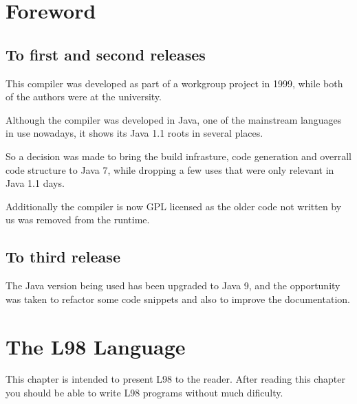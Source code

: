 \documentclass[a4paper, 11pt]{report}
\begin{document}
\lstset{language=ML}

\begin{titlepage}

\vspace{2cm}

\vspace{3cm}


\end{titlepage}

\tableofcontents

\chapter{Foreword}
\section{To first and second releases}
This compiler was developed as part of a workgroup project in 1999, while both
of the authors were at the university.

Although the compiler was developed in Java, one of the mainstream languages in
use nowadays, it shows its Java 1.1 roots in several places.

So a decision was made to bring the build infrasture, code generation and overrall
code structure to Java 7, while dropping a few uses that were only relevant in Java
1.1 days.

Additionally the compiler is now GPL licensed as the older code not written
by us was removed from the runtime.

\section{To third release}
The Java version being used has been upgraded to Java 9, and the opportunity was taken
to refactor some code snippets and also to improve the documentation.


\chapter{The L98 Language}


This chapter is intended to present L98 to the reader. After reading this
chapter you should be able to write L98 programs without much dificulty.
\end{document}
